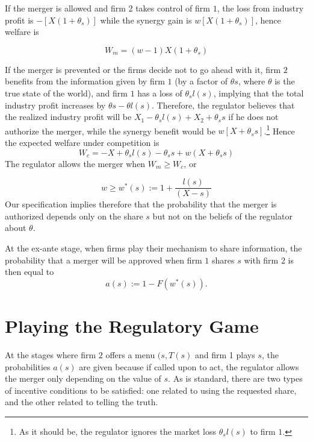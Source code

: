 \documentclass[a4paper]{article}
\renewcommand{\t}{\theta}
\begin{document}
    If the merger is allowed and firm $2$ takes control of firm $1$, the loss from industry profit is $-[X(1+\t_s)]$ while the synergy gain is $w[X(1+\t_s)]$, hence welfare is
    
    $$W_m=(w-1)X(1+\t_s)$$
    
    If the merger is prevented or the firms decide not to go ahead with it, firm $2$ benefits from the information given by firm $1$ (by a factor of $\t s$, where $\t$ is the true state of the world), and firm $1$ has a loss of $\t_s l(s)$, implying that the total industry profit increases by $\t s -\t l(s)$. Therefore, the regulator believes that the realized industry profit will be $X_1-\t_s l(s)+X_2+\t_s s$ if he does not authorize the merger, while the synergy benefit would be $w[X+\t_s s]$.\footnote{%
    As it should be, the regulator ignores the market loss $\t_s l(s)$ to firm $1$.} Hence the expected welfare under competition is
      $$W_c=-X+\t_s l(s)-\t_s s + w (X+\t_s s)$$
    The regulator allows the merger when $W_m\geq W_c$, or
    
    \begin{equation}
           w\geq w^*(s):=1 + \frac{l(s)}{(X-s)}
    \end{equation}
%
Our specification implies therefore that the probability that the merger is authorized depends only on the share $s$ but not on the beliefs of the regulator about $\t$.

At the ex-ante stage, when firms play their mechanism to share information, the probability that a merger will be approved when firm $1$ shares $s$ with firm $2$ is then equal to  
\[
a(s):=1-F(w^*(s)).
\]


\section{Playing the Regulatory Game}

At the stages where firm $2$ offers a menu $(s,T(s)$ and firm 1 plays $s$, the probabilities $a(s)$ are given because if called upon to act, the regulator allows the merger only depending on the value of $s$. As is standard, there are two types of incentive conditions to be satisfied: one related to using the requested share, and the other related to telling the truth.

\end{document}
